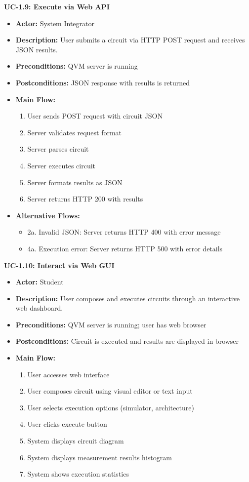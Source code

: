 \textbf{UC-1.9: Execute via Web API}
\begin{itemize}
\item \textbf{Actor:} System Integrator
\item \textbf{Description:} User submits a circuit via HTTP POST request and receives JSON results.
\item \textbf{Preconditions:} QVM server is running
\item \textbf{Postconditions:} JSON response with results is returned
\item \textbf{Main Flow:}
\begin{enumerate}
\item User sends POST request with circuit JSON
\item Server validates request format
\item Server parses circuit
\item Server executes circuit
\item Server formats results as JSON
\item Server returns HTTP 200 with results
\end{enumerate}
\item \textbf{Alternative Flows:}
\begin{itemize}
\item 2a. Invalid JSON: Server returns HTTP 400 with error message
\item 4a. Execution error: Server returns HTTP 500 with error details
\end{itemize}
\end{itemize}

\textbf{UC-1.10: Interact via Web GUI}
\begin{itemize}
\item \textbf{Actor:} Student
\item \textbf{Description:} User composes and executes circuits through an interactive web dashboard.
\item \textbf{Preconditions:} QVM server is running; user has web browser
\item \textbf{Postconditions:} Circuit is executed and results are displayed in browser
\item \textbf{Main Flow:}
\begin{enumerate}
\item User accesses web interface
\item User composes circuit using visual editor or text input
\item User selects execution options (simulator, architecture)
\item User clicks execute button
\item System displays circuit diagram
\item System displays measurement results histogram
\item System shows execution statistics
\end{enumerate}
\end{itemize}

